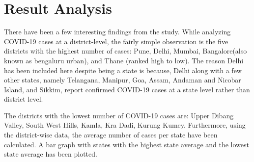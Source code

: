 \documentclass[a4paper,11pt]{article}
\begin{document}
\section{Result Analysis}

There have been a few interesting findings from the study. While analyzing COVID-19 cases at a district-level, the fairly simple observation is the five districts with the highest number of cases: Pune, Delhi, Mumbai, Bangalore(also known as bengaluru urban), and Thane (ranked high to low). The reason Delhi has been included here despite being a state is because, Delhi along with a few other states, namely Telangana, Manipur, Goa, Assam, Andaman and Nicobar Island, and Sikkim, report confirmed COVID-19 cases at a state level rather than district level.\par

The districts with the lowest number of COVID-19 cases are: Upper Dibang Valley, South West Hills, Kamla, Kra Dadi, Kurung Kumey. Furthermore, using the district-wise data, the average number of cases per state have been calculated. A bar graph with states with the highest state average and the lowest state average has been plotted.\par
\end{document}
